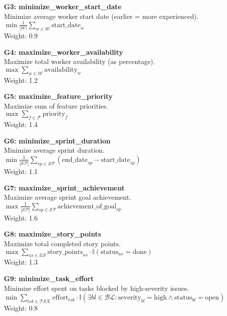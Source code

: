 \documentclass[12pt]{article}
\begin{document}
    \item \textbf{G3: minimize\_worker\_start\_date} \\
    Minimize average worker start date (earlier = more experienced). \\
    $\min \frac{1}{|\mathcal{W}|} \sum_{w \in \mathcal{W}} \text{start\_date}_w$ \\
    Weight: 0.9

    \item \textbf{G4: maximize\_worker\_availability} \\
    Maximize total worker availability (as percentage). \\
    $\max \sum_{w \in \mathcal{W}} \text{availability}_w$ \\
    Weight: 1.2

    \item \textbf{G5: maximize\_feature\_priority} \\
    Maximize sum of feature priorities. \\
    $\max \sum_{f \in \mathcal{F}} \text{priority}_f$ \\
    Weight: 1.4

    \item \textbf{G6: minimize\_sprint\_duration} \\
    Minimize average sprint duration. \\
    $\min \frac{1}{|\mathcal{SP}|} \sum_{sp \in \mathcal{SP}} (\text{end\_date}_{sp} - \text{start\_date}_{sp})$ \\
    Weight: 1.1

    \item \textbf{G7: maximize\_sprint\_achievement} \\
    Maximize average sprint goal achievement. \\
    $\max \frac{1}{|\mathcal{SP}|} \sum_{sp \in \mathcal{SP}} \text{achievement\_of\_goal}_{sp}$ \\
    Weight: 1.6

    \item \textbf{G8: maximize\_story\_points} \\
    Maximize total completed story points. \\
    $\max \sum_{us \in \mathcal{US}} \text{story\_points}_{us} \cdot \mathbb{I}(\text{status}_{us} = \text{done})$ \\
    Weight: 1.3

    \item \textbf{G9: minimize\_task\_effort} \\
    Minimize effort spent on tasks blocked by high-severity issues. \\
    $\min \sum_{tsk \in \mathcal{TSK}} \text{effort}_{tsk} \cdot \mathbb{I}(\exists bl \in \mathcal{BL}: \text{severity}_{bl} = \text{high} \land \text{status}_{bl} = \text{open})$ \\
    Weight: 0.8
\end{document}

